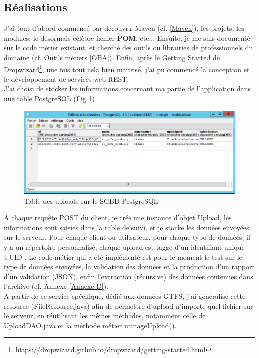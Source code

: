 \begin{itemize}
\subsection{Réalisations}

J'ai tout d'abord commencé par découvrir Maven (cf. \ref{Maven}), les projets, les modules, le désormais célèbre fichier \textbf{POM}, etc...
Ensuite, je me suis documenté sur le code métier existant, et cherché des outils ou librairies de professionnels du domaine (cf. Outils métiers \ref{OBA}).
Enfin, après le \og Getting Started \fg de Dropwizard\footnote{\url{https://dropwizard.github.io/dropwizard/getting-started.html}}, une fois tout cela bien maîtrisé, j'ai pu commencé la conception et le développement de services web REST.\\

J'ai choisi de stocker les informations concernant ma partie de l'application dans une table PostgreSQL (Fig \ref{TablePostgres})\\
\begin{figure}[!h]
\centering
\includegraphics[width=14cm]{images/tablePostgres_mobiupload_small.png}
\caption{\label{TablePostgres}Table des uploads sur le SGBD PostgreSQL}
\end{figure} 

A chaque requête POST du client, je créé une instance d'objet Upload, les informations sont saisies dans la table de suivi, et je stocke les données envoyées sur le serveur. Pour chaque client ou utilisateur, pour chaque type de données, il y a un répertoire personnalisé, chaque upload est \og taggé \fg d'un identifiant unique \og UUID \fg.
Le code métier qui a été implémenté est pour le moment le test sur le type de données envoyées, la validation des données et la production d'un rapport d'un validation (JSON), enfin l'extraction (récursive) des données contenues dans l'archive (cf. Annexe \ref{Annexe D}).\\

A partir de ce service spécifique, dédié aux données GTFS, j'ai généralisé cette resource (FileResource.java) afin de permettre d'upload n'importe quel fichier sur le serveur, en réutilisant les mêmes méthodes, notamment celle de UploadDAO.java et la méthode \og métier \fg manageUpload().\\


\end{itemize}
